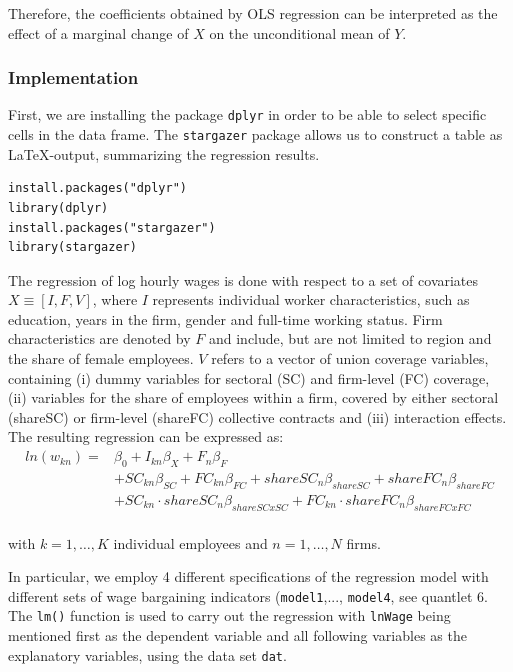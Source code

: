 Therefore, the coefficients obtained by OLS regression can be interpreted as the effect of a marginal change of $X$ on the unconditional mean of $Y$.

\subsubsection*{Implementation}
First, we are installing the package \texttt{dplyr} in order to be able to select specific cells in the data frame. The \texttt{stargazer} package allows us to construct a table as \LaTeX -output, summarizing the regression results.
\lstset{firstnumber = 416}
\begin{lstlisting}
install.packages("dplyr")
library(dplyr)
install.packages("stargazer")
library(stargazer)
\end{lstlisting}
The regression of log hourly wages is done with respect to a set of covariates $ X \equiv [I, F, V] $, where $ I $ represents individual worker characteristics, such as education, years in the firm, gender and full-time working status. Firm characteristics are denoted by $ F $ and include, but are not limited to region and the share of female employees. $V$ refers to a vector of union coverage variables, containing (i) dummy variables for sectoral (SC) and firm-level (FC) coverage, (ii) variables for the share of employees within a firm, covered by either sectoral (shareSC) or firm-level (shareFC) collective contracts and (iii) interaction effects. The resulting regression can be expressed as:
\begin{equation}\label{OLS equation}
\begin{split}
   ln(w_{kn})= &  \beta_{0}+I_{kn}\beta_{X}+F_{n}\beta_{F} \\
   & +SC_{kn}\beta_{SC}+FC_{kn}\beta_{FC}+ shareSC_{n}\beta_{shareSC} +shareFC_{n}\beta_{shareFC}\\
   &  +SC_{kn} \cdot shareSC_{n}\beta_{shareSCxSC}+FC_{kn}\cdot shareFC_{n}\beta_{shareFCxFC} \\
\end{split}
\end{equation}
\begin{center}with $k=1,\dots , K$ individual employees and $n=1,\dots , N$ firms.\end{center}
In particular, we employ 4 different specifications of the regression model with different sets of wage bargaining indicators (\texttt{model1},..., \texttt{model4}, see quantlet 6. The \texttt{lm()} function is used to carry out the regression with \texttt{lnWage} being mentioned first as the dependent variable and all following variables as the explanatory variables, using the data set \texttt{dat}.
